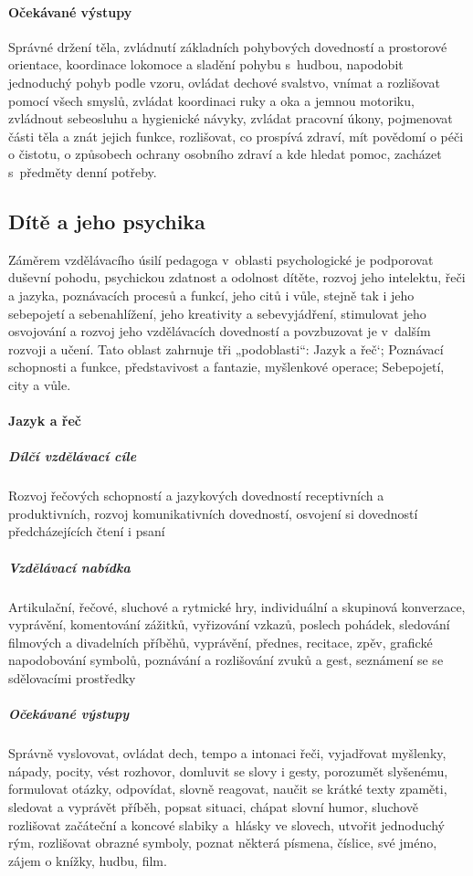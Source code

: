 				\paragraph{Očekávané výstupy}
					Správné držení těla, zvládnutí základních pohybových dovedností a prostorové orientace, koordinace lokomoce a sladění pohybu s hudbou, napodobit jednoduchý pohyb podle vzoru, ovládat dechové svalstvo, vnímat a rozlišovat pomocí všech smyslů, zvládat koordinaci ruky a oka a jemnou motoriku, zvládnout sebeosluhu a hygienické návyky, zvládat pracovní úkony, pojmenovat části těla a znát jejich funkce, rozlišovat, co prospívá zdraví, mít povědomí o péči o čistotu, o způsobech ochrany osobního zdraví a kde hledat pomoc, zacházet s předměty denní potřeby.

			\subsection{Dítě a jeho psychika}
				Záměrem vzdělávacího úsilí pedagoga v oblasti psychologické je podporovat duševní pohodu, psychickou zdatnost a odolnost dítěte, rozvoj jeho intelektu, řeči a jazyka, poznávacích procesů a funkcí, jeho citů i vůle, stejně tak i jeho sebepojetí a sebenahlížení, jeho kreativity a sebevyjádření, stimulovat jeho osvojování a rozvoj jeho vzdělávacích dovedností a povzbuzovat je v dalším rozvoji a učení.
				Tato oblast zahrnuje tři „podoblasti“: Jazyk a řeč‘; Poznávací schopnosti a funkce, představivost a fantazie, myšlenkové operace; Sebepojetí, city a vůle.

				\paragraph{Jazyk a řeč}

					\subparagraph{Dílčí vzdělávací cíle}
						Rozvoj řečových schopností a jazykových dovedností receptivních a produktivních, rozvoj komunikativních dovedností, osvojení si dovedností předcházejících čtení i psaní
					\subparagraph{Vzdělávací nabídka}
						Artikulační, řečové, sluchové a rytmické hry, individuální a skupinová konverzace, vyprávění, komentování zážitků, vyřizování vzkazů, poslech pohádek, sledování filmových a divadelních příběhů, vyprávění, přednes, recitace, zpěv, grafické napodobování symbolů, poznávání a rozlišování zvuků a gest, seznámení se se sdělovacími prostředky
					\subparagraph{Očekávané výstupy}
						Správně vyslovovat, ovládat dech, tempo a intonaci řeči, vyjadřovat myšlenky, nápady, pocity, vést rozhovor, domluvit se slovy i gesty, porozumět slyšenému, formulovat otázky, odpovídat, slovně reagovat, naučit se krátké texty zpaměti, sledovat a vyprávět příběh, popsat situaci, chápat slovní humor, sluchově rozlišovat začáteční a koncové slabiky a hlásky ve slovech, utvořit jednoduchý rým, rozlišovat obrazné symboly, poznat některá písmena, číslice, své jméno, zájem o knížky, hudbu, film.

